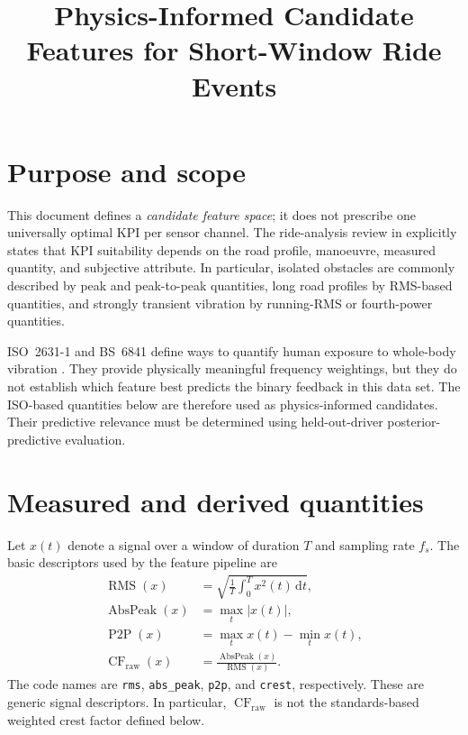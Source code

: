\documentclass[letterpaper,journal]{IEEEtran}
\newcommand{\RMS}{\operatorname{RMS}}
\newcommand{\CF}{\operatorname{CF}}
\newcommand{\PtP}{\operatorname{P2P}}
\newcommand{\AbsPeak}{\operatorname{AbsPeak}}
\begin{document}
\title{Physics-Informed Candidate Features for Short-Window Ride Events}
\author{}
\maketitle

\section{Purpose and scope}

This document defines a \emph{candidate feature space}; it does not prescribe one universally
optimal KPI per sensor channel. The ride-analysis review in \cite{guastadisegni2024} explicitly
states that KPI suitability depends on the road profile, manoeuvre, measured quantity, and
subjective attribute. In particular, isolated obstacles are commonly described by peak and
peak-to-peak quantities, long road profiles by RMS-based quantities, and strongly transient
vibration by running-RMS or fourth-power quantities.

ISO~2631-1 and BS~6841 define ways to quantify human exposure to whole-body vibration
\cite{iso2631,bs6841}. They provide physically meaningful frequency weightings, but they do
not establish which feature best predicts the binary feedback in this data set. The ISO-based
quantities below are therefore used as physics-informed candidates. Their predictive relevance
must be determined using held-out-driver posterior-predictive evaluation.

\section{Measured and derived quantities}

Let $x(t)$ denote a signal over a window of duration $T$ and sampling rate $f_s$. The basic
descriptors used by the feature pipeline are
\begin{align*}
\RMS(x) &= \sqrt{\frac{1}{T}\int_0^T x^2(t)\,\mathrm{d}t},\\
\AbsPeak(x) &= \max_t |x(t)|,\\
\PtP(x) &= \max_t x(t)-\min_t x(t),\\
\CF_{\mathrm{raw}}(x) &= \frac{\AbsPeak(x)}{\RMS(x)}.
\end{align*}
The code names are \texttt{rms}, \texttt{abs\_peak}, \texttt{p2p}, and \texttt{crest},
respectively. These are generic signal descriptors. In particular,
$\CF_{\mathrm{raw}}$ is not the standards-based weighted crest factor defined below.
\end{document}
